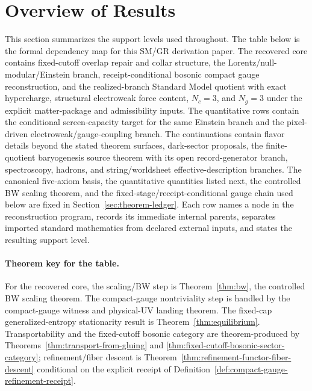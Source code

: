 \documentclass[11pt]{article}
\begin{document}
\section{Overview of Results}

This section summarizes the support levels used throughout. The table below is the formal dependency
map for this SM/GR derivation paper. The recovered core contains fixed-cutoff overlap repair and
collar structure, the Lorentz/null-modular/Einstein branch, receipt-conditional bosonic compact gauge reconstruction,
and the realized-branch Standard Model quotient with exact hypercharge, structural electroweak force content, \(N_c=3\), and \(N_g=3\)
under the explicit matter-package and admissibility inputs. The quantitative rows contain the
conditional screen-capacity target for the same Einstein branch and the pixel-driven electroweak/gauge-coupling
branch. The continuations contain flavor details beyond the stated theorem surfaces, dark-sector
proposals, the finite-quotient baryogenesis source theorem with its open record-generator branch, spectroscopy, hadrons, and string/worldsheet
effective-description branches. The canonical five-axiom basis, the quantitative quantities listed
next, the controlled BW scaling theorem, and the fixed-stage/receipt-conditional gauge chain used below are
fixed in Section~\ref{sec:theorem-ledger}. Each row names a node in the reconstruction program,
records its immediate internal parents, separates imported standard mathematics from declared
external inputs, and states the resulting support level.

\paragraph{Theorem key for the table.}
For the recovered core, the scaling/BW step is Theorem~\ref{thm:bw}, the controlled BW scaling theorem. The compact-gauge nontriviality step is handled by the compact-gauge witness and physical-UV landing theorem. The fixed-cap generalized-entropy stationarity result is Theorem~\ref{thm:equilibrium}. Transportability and the fixed-cutoff bosonic category are theorem-produced by Theorems~\ref{thm:transport-from-gluing} and \ref{thm:fixed-cutoff-bosonic-sector-category}; refinement/fiber descent is Theorem~\ref{thm:refinement-functor-fiber-descent} conditional on the explicit receipt of Definition~\ref{def:compact-gauge-refinement-receipt}.
\end{document}
